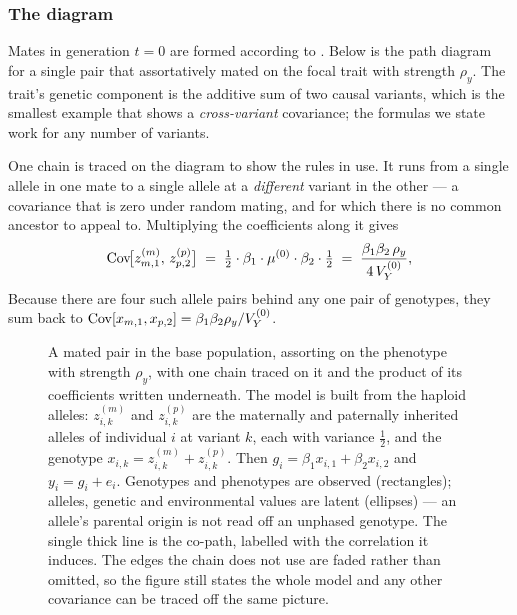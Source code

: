 \documentclass[12pt]{article}
\begin{document}
\subsubsection*{The diagram}
Mates in generation $t=0$ are formed according to .
Below is the path diagram for a single pair that assortatively mated on the focal trait with strength $\rho_y$.
The trait's genetic component is the additive sum of two causal variants, which is the smallest example that shows a \emph{cross-variant} covariance; the formulas we state work for any number of variants.

One chain is traced on the diagram to show the rules in use.
It runs from a single allele in one mate to a single allele at a \emph{different} variant in the other --- a covariance that is zero under random mating, and for which there is no common ancestor to appeal to.
Multiplying the coefficients along it gives
$$
    \mathrm{Cov}\!\big[z^{(m)}_{m,1},\, z^{(p)}_{p,2}\big]
    \;=\; \tfrac12 \cdot \beta_1 \cdot \mu^{(0)} \cdot \beta_2 \cdot \tfrac12
    \;=\; \frac{\beta_1\beta_2\,\rho_y}{4\,V_Y^{(0)}} ,
$$
Because there are four such allele pairs behind any one pair of genotypes, they sum back to $\mathrm{Cov}[x_{m,1}, x_{p,2}] = \beta_1\beta_2\rho_y/V_Y^{(0)}$.

\begin{figure}[H]
    \begin{floatcard}
        
        \caption{%
            A mated pair in the base population, assorting on the phenotype with strength $\rho_y$, with one chain traced on it and the product of its coefficients written underneath.
            The model is built from the haploid alleles: $z^{(m)}_{i,k}$ and $z^{(p)}_{i,k}$ are the maternally and paternally inherited alleles of individual $i$ at variant $k$, each with variance $\tfrac12$, and the genotype $x_{i,k} = z^{(m)}_{i,k} + z^{(p)}_{i,k}$.
            Then $g_i = \beta_1 x_{i,1} + \beta_2 x_{i,2}$ and $y_i = g_i + e_i$.
            Genotypes and phenotypes are observed (rectangles); alleles, genetic and environmental values are latent (ellipses) --- an allele's parental origin is not read off an unphased genotype.
            The single thick line is the co-path, labelled with the correlation it induces.
            The edges the chain does not use are faded rather than omitted, so the figure still states the whole model and any other covariance can be traced off the same picture.%
        }
        \label{fig:pair-2v}
    \end{floatcard}
\end{figure}
\end{document}
